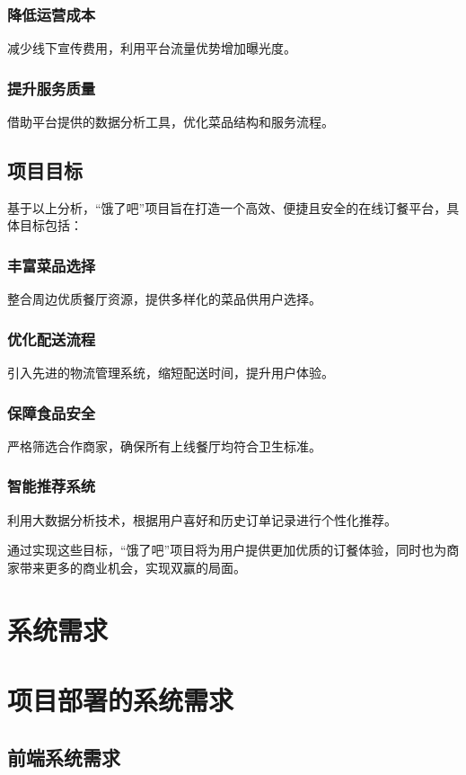 \subsubsection{降低运营成本}
减少线下宣传费用，利用平台流量优势增加曝光度。
\subsubsection{提升服务质量}
借助平台提供的数据分析工具，优化菜品结构和服务流程。

\subsection{项目目标}
基于以上分析，“饿了吧”项目旨在打造一个高效、便捷且安全的在线订餐平台，具体目标包括：
\subsubsection{丰富菜品选择}
整合周边优质餐厅资源，提供多样化的菜品供用户选择。
\subsubsection{优化配送流程}
引入先进的物流管理系统，缩短配送时间，提升用户体验。
\subsubsection{保障食品安全}
严格筛选合作商家，确保所有上线餐厅均符合卫生标准。
\subsubsection{智能推荐系统}
利用大数据分析技术，根据用户喜好和历史订单记录进行个性化推荐。

通过实现这些目标，“饿了吧”项目将为用户提供更加优质的订餐体验，同时也为商家带来更多的商业机会，实现双赢的局面。


\section{系统需求}



\section{项目部署的系统需求}

\subsection{前端系统需求}
